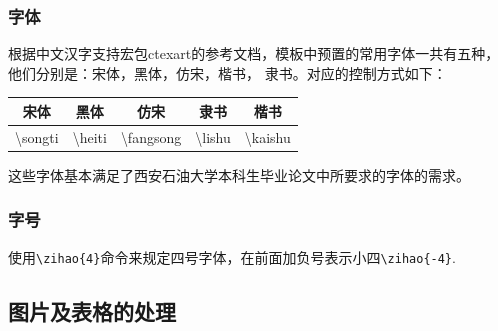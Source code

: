 \subsubsection{字体}
根据中文汉字支持宏包ctexart的参考文档，模板中预置的常用字体一共有五种，他们分别是：宋体，黑体，仿宋，楷书， 隶书。对应的控制方式如下：
\begin{center}
\begin{tabular}{ccccc}
\hline \rule[-2ex]{0pt}{5.5ex} { 宋体} & { 黑体} & { 仿宋} & { 隶书} & {楷书} \\ 
\hline \rule[-2ex]{0pt}{5.5ex} \textbackslash songti &\textbackslash  heiti  & \textbackslash fangsong & \textbackslash lishu & \textbackslash kaishu \\ 
\hline 
\end{tabular}  
\end{center}
这些字体基本满足了西安石油大学本科生毕业论文中所要求的字体的需求。


\subsubsection{字号}
使用\verb|\zihao{4}|命令来规定四号字体，在前面加负号表示小四\verb|\zihao{-4}|.
\subsection{图片及表格的处理}

